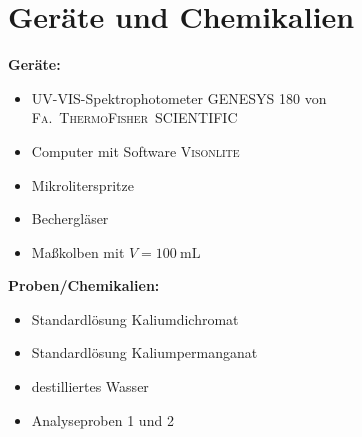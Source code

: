 \section{Geräte und Chemikalien}
\label{sec:geraete}

\textbf{Geräte:}
\begin{itemize}
\item UV-VIS-Spektrophotometer \textsc{GENESYS 180\texttrademark} von \mbox{\textsc{Fa. ThermoFisher SCIENTIFIC}}
\item Computer mit Software \textsc{Visonlite}
\item Mikroliterspritze
\item Bechergläser
\item Maßkolben mit $V=\SI{100}{\milli \liter}$
\end{itemize}

\vspace*{5mm}

\textbf{Proben/Chemikalien:}
\begin{itemize}
\item Standardlösung Kaliumdichromat
\item Standardlösung Kaliumpermanganat
\item destilliertes Wasser
\item Analyseproben 1 und 2
\end{itemize}





